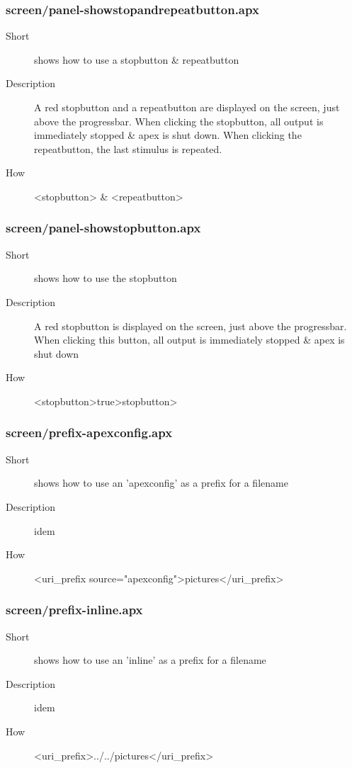 \subsubsection{screen/panel-showstopandrepeatbutton.apx}
\begin{description}
\item[Short] 
 shows how to use a stopbutton \& repeatbutton
\item[Description] 
 A red stopbutton and a repeatbutton are displayed on the screen, just above the progressbar. When clicking the stopbutton, all output is immediately stopped \& apex is shut down. When clicking the repeatbutton, the last stimulus is repeated.
\item[How] 
 \textless{}stopbutton\textgreater{} \& \textless{}repeatbutton\textgreater{}
\end{description}

\subsubsection{screen/panel-showstopbutton.apx}
\begin{description}
\item[Short] 
 shows how to use the stopbutton
\item[Description] 
 A red stopbutton is displayed on the screen, just above the progressbar. When clicking this button, all output is immediately stopped \& apex is shut down
\item[How] 
 \textless{}stopbutton\textgreater{}true\textgreater{}stopbutton\textgreater{}
\end{description}

\subsubsection{screen/prefix-apexconfig.apx}
\begin{description}
\item[Short] 
 shows how to use an 'apexconfig' as a prefix for a filename
\item[Description] 
  idem
\item[How] 
 \textless{}uri\_prefix source="apexconfig"\textgreater{}pictures\textless{}/uri\_prefix\textgreater{}
\end{description}

\subsubsection{screen/prefix-inline.apx}
\begin{description}
\item[Short] 
 shows how to use an 'inline' as a prefix for a filename
\item[Description] 
 idem
\item[How] 
 \textless{}uri\_prefix\textgreater{}../../pictures\textless{}/uri\_prefix\textgreater{}
\end{description}


